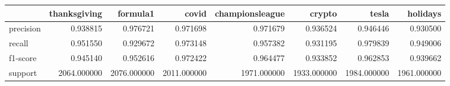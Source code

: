 \begin{tabular}{lrrrrrrr}
\toprule
{} &  thanksgiving &     formula1 &        covid &  championsleague &       crypto &        tesla &     holidays \\
\midrule
precision &      0.938815 &     0.976721 &     0.971698 &         0.971679 &     0.936524 &     0.946446 &     0.930500 \\
recall    &      0.951550 &     0.929672 &     0.973148 &         0.957382 &     0.931195 &     0.979839 &     0.949006 \\
f1-score  &      0.945140 &     0.952616 &     0.972422 &         0.964477 &     0.933852 &     0.962853 &     0.939662 \\
support   &   2064.000000 &  2076.000000 &  2011.000000 &      1971.000000 &  1933.000000 &  1984.000000 &  1961.000000 \\
\bottomrule
\end{tabular}

